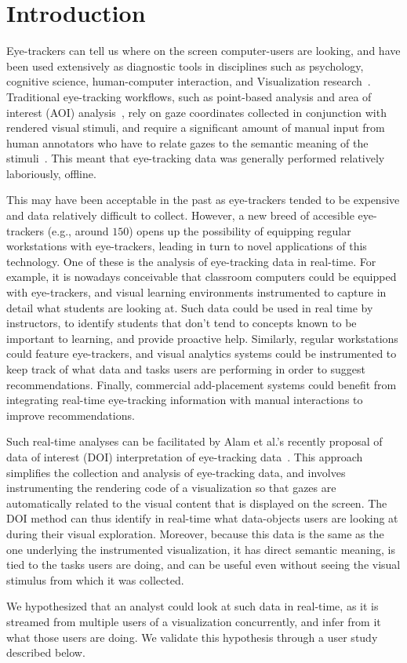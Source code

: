 \section{Introduction}

Eye-trackers can tell us where on the screen computer-users are looking, and have been used extensively as diagnostic tools in disciplines such as psychology, cognitive science, human-computer interaction, and Visualization research~\cite{duchowski2002breadth}. Traditional eye-tracking workflows, such as point-based analysis and area of interest (AOI) analysis~\cite{blascheckstate}, rely on gaze coordinates collected in conjunction with rendered visual stimuli, and require a significant amount of manual input from human annotators who have to relate gazes to the semantic meaning of the stimuli~\cite{alamdata}. This meant  that eye-tracking data was generally performed relatively laboriously, offline.  

This may have been acceptable in the past as eye-trackers tended to be expensive and data relatively difficult to collect. However, a new breed of accesible eye-trackers (e.g., around $150$) opens up the possibility of equipping regular workstations with eye-trackers, leading in turn to novel applications of this technology. One of these is the analysis of eye-tracking data in real-time. For example, it is nowadays conceivable that classroom computers could be equipped with eye-trackers, and visual learning environments instrumented to capture in detail what students are looking at. Such data could be used in real time by instructors, to identify students that don't tend to concepts known to be important to learning, and provide proactive help. Similarly, regular workstations could feature eye-trackers, and visual analytics systems could be instrumented to keep track of what data and tasks users are performing in order to suggest recommendations. Finally, commercial add-placement systems could benefit from integrating real-time eye-tracking information with manual interactions to improve recommendations.

Such real-time analyses can be facilitated by  Alam et al.'s recently proposal of data of interest (DOI) interpretation of eye-tracking data~\cite{alamdata}. This approach simplifies the collection and analysis of eye-tracking data, and involves instrumenting the rendering code of a visualization so that gazes  are automatically related to the visual content that is displayed on the screen. The DOI method can thus identify in real-time what data-objects users are looking at during their visual exploration. Moreover, because this data is the same as the one underlying the instrumented visualization, it has direct semantic meaning, is tied to the tasks users are doing, and can be useful even without seeing the visual stimulus from which it was collected.

We hypothesized that an analyst could look at such data in real-time, as it is streamed from multiple users of a visualization concurrently, and infer from it what those users are doing. We validate this hypothesis through a user study described below.   

 
